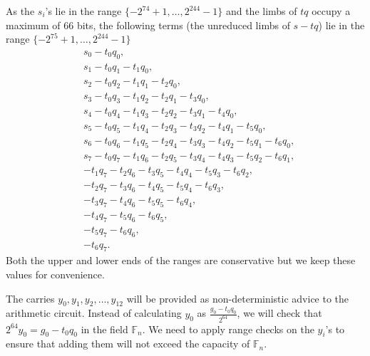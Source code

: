 \documentclass[a4paper, 12pt]{article}
\begin{document}
As the $s_i$'s lie in the range $\{-2^{74}+1,\ldots, 2^{244}-1\}$ and the limbs of $tq$ occupy a maximum of 66 bits, the following terms (the unreduced limbs of $s-tq$) lie in the range $\{-2^{75}+1,\ldots,2^{244}-1\}$
\begin{align*}
  & s_0 - t_0q_0,\\
  & s_1 - t_0q_1-t_1q_0,\\
  & s_2 - t_0q_2-t_1q_1-t_2q_0,\\
  & s_3 -  t_0q_3-t_1q_2-t_2q_1-t_3q_0,\\
  & s_4 -  t_0q_4-t_1q_3-t_2q_2-t_3q_1-t_4q_0,\\
  & s_5 -  t_0q_5-t_1q_4-t_2q_3-t_3q_2-t_4q_1-t_5q_0,\\
  & s_6 -  t_0q_6-t_1q_5-t_2q_4-t_3q_3-t_4q_2-t_5q_1-t_6q_0,\\
  & s_7 -  t_0q_7-t_1q_6-t_2q_5-t_3q_4-t_4q_3-t_5q_2-t_6q_1,\\
  &  -  t_1q_7-t_2q_6-t_3q_5-t_4q_4-t_5q_3-t_6q_2,\\
  &  -  t_2q_7-t_3q_6-t_4q_5-t_5q_4-t_6q_3,\\
  &  -  t_3q_7-t_4q_6-t_5q_5-t_6q_4,\\
  &  -  t_4q_7-t_5q_6-t_6q_5,\\
  &  -  t_5q_7-t_6q_6,\\
  &  -  t_6q_7.
\end{align*}
Both the upper and lower ends of the ranges are conservative but we keep these values for convenience.


The carries $y_0,y_1,y_2,\ldots,y_{12}$ will be provided as non-deterministic advice to the arithmetic circuit. Instead of calculating $y_0$ as $\frac{g_0-t_0q_0}{2^{64}}$, we will check that $2^{64}y_0 = g_0-t_0q_0$ in the field $\mathbb{F}_n$. We need to apply range checks on the $y_i$'s to ensure that adding them will not exceed the capacity of $\mathbb{F}_n$.
\end{document}
